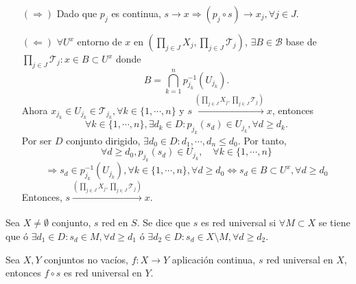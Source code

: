 \begin{dem}
  \begin{enumerate}[label=(\roman*)]
    \item []
    \item [$(\Rightarrow)$] Dado que $p_{j}$ es continua, $s \rightarrow x \Rightarrow (p_{j} \circ s) \rightarrow x_{j}, \forall j \in J$.
    \item [$(\Leftarrow)$] $\forall U^{x}$ entorno de $x$ en $( \prod_{j \in J} X_{j}, \prod_{j \in J} \mathcal{T}_{j} )$, $\exists B \in \mathcal{B}$ base de $\prod_{j \in J} \mathcal{T}_{j} : x \in B \subset U^{x}$ donde 
      \[ 
        B = \bigcap_{k = 1}^{n} p_{j_{k}}^{-1}(U_{j_{k}}) .
      \] 
      Ahora $x_{j_{k}} \in U_{j_{k}} \in \mathcal{T}_{j_{k}}, \forall k \in \{ 1, \cdots, n \}$ y $s \xrightarrow[]{ ( \prod_{j \in J} X_{j}, \prod_{j \in J} \mathcal{T}_{j} ) } x$, entonces
      \[
        \forall k \in \{ 1, \cdots, n \}, \exists d_{k} \in D : p_{j_{k}}(s_{d}) \in U_{j_{k}}, \forall d \geq d_{k}.
      \]
      Por ser $D$ conjunto dirigido, $\exists d_{0} \in D : d_{1}, \cdots, d_{n} \leq d_{0}$. Por tanto,
      \[
        \forall d \geq d_{0}, p_{j_{k}}(s_{d}) \in U_{j_{k}}, \quad \forall k \in \{ 1, \cdots, n \} 
      \]
      \[ 
        \Rightarrow s_{d} \in p_{j_{k}}^{-1}(U_{j_{k}}), \forall k \in \{ 1, \cdots, n \}, \forall d \geq d_{0} \Leftrightarrow s_{d} \in B \subset U^{x}, \forall d \geq d_{0} 
      \] 
      Entonces, $s \xrightarrow[]{ ( \prod_{j \in J} X_{j}, \prod_{j \in J} \mathcal{T}_{j} ) } x$.
  \end{enumerate}
\end{dem}

\begin{defn}
  Sea $X \neq \emptyset$ conjunto, $s$ red en $S$. Se dice que $s$ es red universal si $\forall M \subset X$ se tiene que ó $\exists d_{1} \in D : s_{d} \in M, \forall d \geq d_{1}$ ó $\exists d_{2} \in D : s_{d} \in X \setminus M, \forall d \geq d_{2}$.
\end{defn}

\begin{prop}
  Sea $X, Y$ conjuntos no vacíos, $f : X \to Y$ aplicación continua, $s$ red universal en $X$, entonces $f \circ s$ es red universal en $Y$.
\end{prop}


